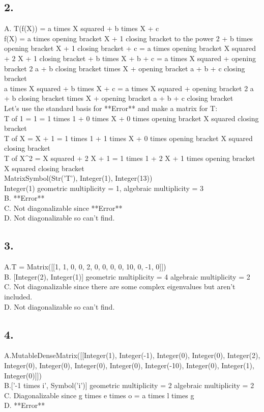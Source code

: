 \documentclass{article}
\begin{document}
\subsection*{2.}
A. T(f(X)) = a times X squared + b times X + c
\\f(X) = a times opening bracket X + 1 closing bracket to the power 2 + b times opening bracket X + 1 closing bracket + c = a times opening bracket X squared + 2 X + 1 closing bracket + b times X + b + c = a times X squared + opening bracket 2 a + b closing bracket times X + opening bracket a + b + c closing bracket
\\a times X squared + b times X + c = a times X squared + opening bracket 2 a + b closing bracket times X + opening bracket a + b + c closing bracket
\\Let's use the standard basis for **Error** and make a matrix for T:
\\T of 1 = 1 = 1 times 1 + 0 times X + 0 times opening bracket X squared closing bracket 
\\T of X = X + 1 = 1 times 1 + 1 times X + 0 times opening bracket X squared closing bracket
\\T of X^2 = X squared + 2 X + 1 = 1 times 1 + 2 X + 1 times opening bracket X squared closing bracket
\\[10px]
MatrixSymbol(Str('T'), Integer(1), Integer(13))
\\Integer(1) geometric multiplicity = 1, algebraic multiplicity  = 3
\\B. **Error**
\\C. Not diagonalizable since **Error**
\\D. Not diagonalizable so can't find.
\subsection*{3.}
A.T = Matrix([[1, 1, 0, 0, 2, 0, 0, 0, 0, 10, 0, -1, 0]])
\\B. [Integer(2), Integer(1)] geometric multiplicity = 4 algebraic multiplicity = 2
\\C. Not diagonalizable since there are some complex eigenvalues but aren't included.
\\D. Not diagonalizable so can't find.

\subsection*{4.}
A.MutableDenseMatrix([[Integer(1), Integer(-1), Integer(0), Integer(0), Integer(2), Integer(0), Integer(0), Integer(0), Integer(0), Integer(-10), Integer(0), Integer(1), Integer(0)]])
\\B.['-1 times i', Symbol('i')]  geometric multiplicity = 2 algebraic multiplicity = 2
\\C. Diagonalizable since g times e times o = a times l times g
\\D. **Error**
\pagebreak
\end{document}
